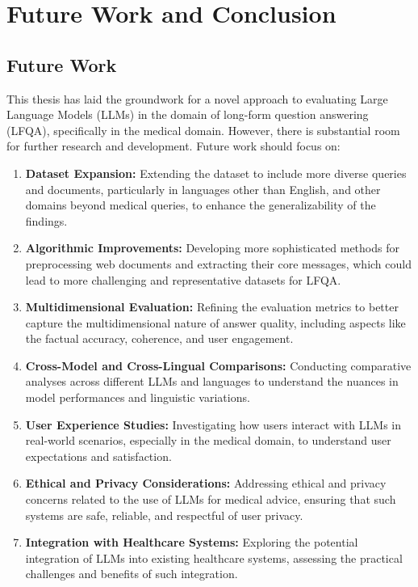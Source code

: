 \chapter{Future Work and Conclusion}\label{conclusion}

\section{Future Work}
This thesis has laid the groundwork for a novel approach to evaluating Large Language Models (LLMs) in the domain of long-form question answering (LFQA), specifically in the medical domain. However, there is substantial room for further research and development. Future work should focus on:

\begin{enumerate}
    \item \textbf{Dataset Expansion:} Extending the dataset to include more diverse queries and documents, particularly in languages other than English, and other domains beyond medical queries, to enhance the generalizability of the findings.
    \item \textbf{Algorithmic Improvements:} Developing more sophisticated methods for preprocessing web documents and extracting their core messages, which could lead to more challenging and representative datasets for LFQA.
    \item \textbf{Multidimensional Evaluation:} Refining the evaluation metrics to better capture the multidimensional nature of answer quality, including aspects like the factual accuracy, coherence, and user engagement.
    \item \textbf{Cross-Model and Cross-Lingual Comparisons:} Conducting comparative analyses across different LLMs and languages to understand the nuances in model performances and linguistic variations.
    \item \textbf{User Experience Studies:} Investigating how users interact with LLMs in real-world scenarios, especially in the medical domain, to understand user expectations and satisfaction.
    \item \textbf{Ethical and Privacy Considerations:} Addressing ethical and privacy concerns related to the use of LLMs for medical advice, ensuring that such systems are safe, reliable, and respectful of user privacy.
    \item \textbf{Integration with Healthcare Systems:} Exploring the potential integration of LLMs into existing healthcare systems, assessing the practical challenges and benefits of such integration.
\end{enumerate}


